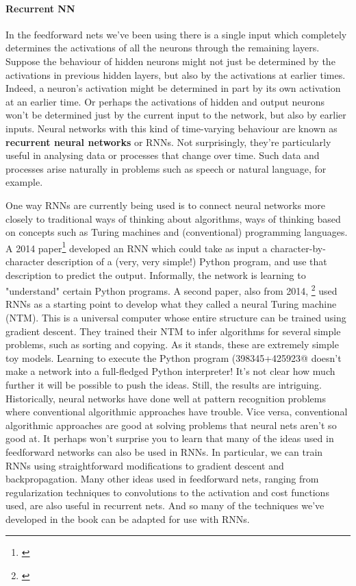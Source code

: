 \documentclass[12pt, letterpaper]{article}
\theoremstyle{definition}
\let\tb\textbf
\begin{document}
\paragraph{\tb{Recurrent NN}} In the feedforward nets we've been using there is a single input which completely determines the activations of all the neurons through the remaining layers. Suppose the behaviour of hidden neurons might not just be determined by the activations in previous hidden layers, but also by the activations at earlier times. Indeed, a neuron's activation might be determined in part by its own activation at an earlier time.  Or perhaps the activations of hidden and output neurons won't be determined just by the current input to the network, but also by earlier inputs. Neural networks with this kind of time-varying behaviour are known as \tb{recurrent neural networks} or RNNs. Not surprisingly, they're particularly useful in analysing data or processes that change over time. Such data and processes arise naturally in problems such as speech or natural language, for example.

One way RNNs are currently being used is to connect neural networks more closely to traditional ways of thinking about algorithms, ways of thinking based on concepts such as Turing machines and (conventional) programming languages. A 2014 paper\footnote{\href{http://arxiv.org/abs/1410.4615}{}} developed an RNN which could take as input a character-by-character description of a (very, very simple!) Python program, and use that description to predict the output. Informally, the network is learning to "understand" certain Python programs. A second paper, also from 2014, \footnote{\href{http://arxiv.org/abs/1410.5401}{}} used RNNs as a starting point to develop what they called a neural Turing machine (NTM). This is a universal computer whose entire structure can be trained using gradient descent. They trained their NTM to infer algorithms for several simple problems, such as sorting and copying. As it stands, these are extremely simple toy models. Learning to execute the Python program \lstinline@print(398345+425923@ doesn't make a network into a full-fledged Python interpreter! It's not clear how much further it will be possible to push the ideas. Still, the results are intriguing. Historically, neural networks have done well at pattern recognition problems where conventional algorithmic approaches have trouble. Vice versa, conventional algorithmic approaches are good at solving problems that neural nets aren't so good at. It perhaps won't surprise you to learn that many of the ideas used in feedforward networks can also be used in RNNs. In particular, we can train RNNs using straightforward modifications to gradient descent and backpropagation. Many other ideas used in feedforward nets, ranging from regularization techniques to convolutions to the activation and cost functions used, are also useful in recurrent nets. And so many of the techniques we've developed in the book can be adapted for use with RNNs.
\end{document}
